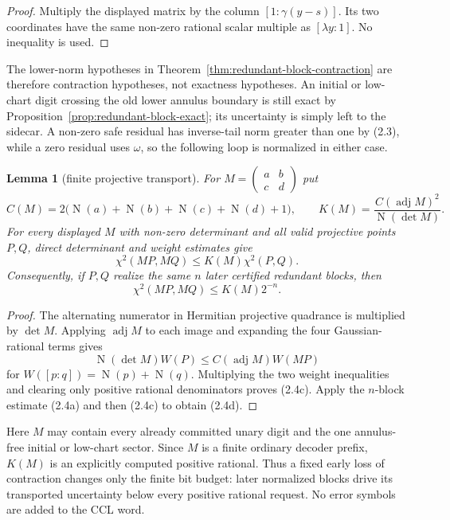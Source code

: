 \documentclass[10pt]{article}
\newtheorem{lemma}[theorem]{Lemma}
\theoremstyle{definition}
\theoremstyle{remark}
\newcommand{\Norm}{\operatorname{N}}
\newcommand{\mat}[4]{\begin{pmatrix}#1&#2\\#3&#4\end{pmatrix}}
\begin{document}
\begin{proof}
Multiply the displayed matrix by the column
$[1:\gamma(y-s)]$.  Its two coordinates have the same non-zero rational
scalar multiple as $[\lambda y:1]$.  No inequality is used.
\end{proof}

The lower-norm hypotheses in
Theorem~\ref{thm:redundant-block-contraction} are therefore contraction
hypotheses, not exactness hypotheses.  An initial or low-chart digit crossing
the old lower annulus boundary is still exact by
Proposition~\ref{prop:redundant-block-exact}; its uncertainty is simply left
to the sidecar.  A non-zero safe residual has inverse-tail norm greater than
one by (2.3), while a zero residual uses $\omega$, so the following loop is
normalized in either case.

\begin{lemma}[finite projective transport]
\label{lem:finite-projective-transport}
For
$M=\mat{a}{b}{c}{d}$ put
\[
 C(M)=2\bigl(\Norm(a)+\Norm(b)+\Norm(c)+\Norm(d)+1\bigr),
 \qquad
 K(M)=\frac{C(\operatorname{adj}M)^2}{\Norm(\det M)}.
\]
For every displayed $M$ with non-zero determinant and all valid projective
points $P,Q$, direct determinant and weight estimates give
\[
 \chi^2(MP,MQ)\le K(M)\chi^2(P,Q).
\tag{2.4c}
\]
Consequently, if $P,Q$ realize the same $n$ later certified redundant
blocks, then
\[
 \chi^2(MP,MQ)\le K(M)2^{-n}.
\tag{2.4d}
\]
\end{lemma}

\begin{proof}
The alternating numerator in Hermitian projective quadrance is multiplied by
$\det M$.  Applying $\operatorname{adj}M$ to each image and expanding the
four Gaussian-rational terms gives
\[
 \Norm(\det M)W(P)\le C(\operatorname{adj}M)W(MP)
\]
for $W([p:q])=\Norm(p)+\Norm(q)$.  Multiplying the two weight inequalities
and clearing only positive rational denominators proves (2.4c).
Apply the $n$-block estimate (2.4a) and then (2.4c) to obtain (2.4d).
\end{proof}

Here $M$ may contain every already committed unary digit and the one
annulus-free initial or low-chart sector.  Since $M$ is a finite ordinary
decoder prefix, $K(M)$ is an explicitly computed positive rational.  Thus a
fixed early loss of contraction changes only the finite bit budget: later
normalized blocks drive its transported uncertainty below every positive
rational request.  No error symbols are added to the CCL word.
\end{document}
